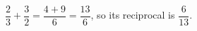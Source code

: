$\dfrac{2}{3}+\dfrac{3}{2}=\dfrac{4+9}{6}=\dfrac{13}{6}$, so its reciprocal is $\boxed{\dfrac{6}{13}}$.
